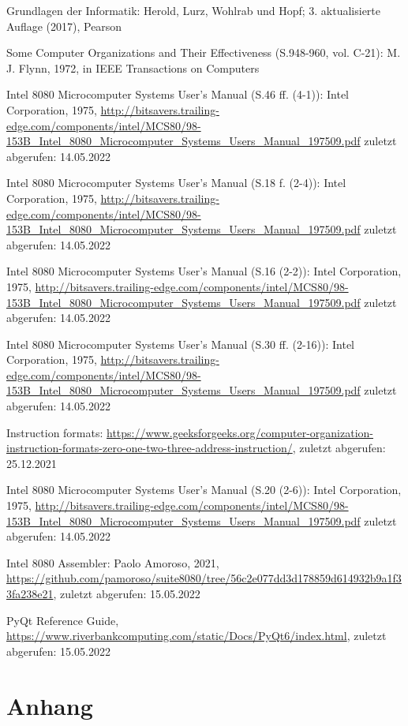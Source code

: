 \documentclass[12pt]{article}
\newcounter{applabelno}
\newcommand{\applabel}[1]{\refstepcounter{applabelno}\label{#1}}
\begin{document}
\newpage


\begin{thebibliography}{9}

Grundlagen der Informatik: Herold, Lurz, Wohlrab und Hopf; 3. aktualisierte Auflage (2017), Pearson

Some Computer Organizations and Their Effectiveness (S.948-960, vol. C-21): M. J. Flynn, 1972, in IEEE Transactions on Computers

Intel 8080 Microcomputer Systems User's Manual (S.46 ff. (4-1)): Intel Corporation, 1975, \url{http://bitsavers.trailing-edge.com/components/intel/MCS80/98-153B_Intel_8080_Microcomputer_Systems_Users_Manual_197509.pdf} zuletzt abgerufen: 14.05.2022

Intel 8080 Microcomputer Systems User's Manual (S.18 f. (2-4)): Intel Corporation, 1975, \url{http://bitsavers.trailing-edge.com/components/intel/MCS80/98-153B_Intel_8080_Microcomputer_Systems_Users_Manual_197509.pdf} zuletzt abgerufen: 14.05.2022

Intel 8080 Microcomputer Systems User's Manual (S.16 (2-2)): Intel Corporation, 1975, \url{http://bitsavers.trailing-edge.com/components/intel/MCS80/98-153B_Intel_8080_Microcomputer_Systems_Users_Manual_197509.pdf} zuletzt abgerufen: 14.05.2022

Intel 8080 Microcomputer Systems User's Manual (S.30 ff. (2-16)): Intel Corporation, 1975, \url{http://bitsavers.trailing-edge.com/components/intel/MCS80/98-153B_Intel_8080_Microcomputer_Systems_Users_Manual_197509.pdf} zuletzt abgerufen: 14.05.2022

Instruction formats: \url{https://www.geeksforgeeks.org/computer-organization-instruction-formats-zero-one-two-three-address-instruction/}, zuletzt abgerufen: 25.12.2021

Intel 8080 Microcomputer Systems User's Manual (S.20 (2-6)): Intel Corporation, 1975, \url{http://bitsavers.trailing-edge.com/components/intel/MCS80/98-153B_Intel_8080_Microcomputer_Systems_Users_Manual_197509.pdf} zuletzt abgerufen: 14.05.2022

Intel 8080 Assembler: Paolo Amoroso, 2021, \url{https://github.com/pamoroso/suite8080/tree/56c2e077dd3d178859d614932b9a1f33fa238e21}, zuletzt abgerufen: 15.05.2022

\bibitem{}
PyQt Reference Guide, \url{https://www.riverbankcomputing.com/static/Docs/PyQt6/index.html}, zuletzt abgerufen: 15.05.2022

\end{thebibliography}

\newpage
\thispagestyle{empty}


\appendix
\section*{Anhang}

\applabel{anhang:instr_state}

\end{document}
